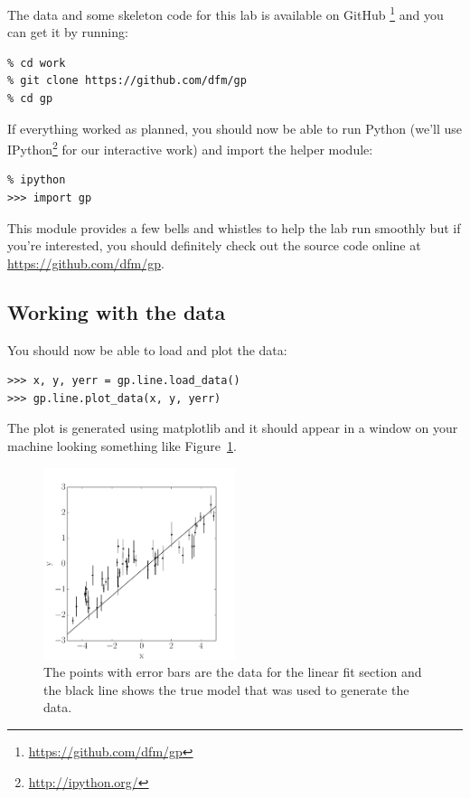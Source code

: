\documentclass[12pt,preprint]{aastex}
\newcommand{\project}[1]{{\sffamily #1}}
\newcommand{\ipython}{\project{IPython}}
\newcommand{\Fig}[1]{Figure~\ref{fig:#1}}
\newcommand{\fig}[1]{\Fig{#1}}
\newcommand{\figlabel}[1]{\label{fig:#1}}
\begin{document}
The data and some skeleton code for this lab is available on GitHub%
\footnote{\url{https://github.com/dfm/gp}} and you can get it by running:
\begin{lstlisting}
% cd work
% git clone https://github.com/dfm/gp
% cd gp
\end{lstlisting}

If everything worked as planned, you should now be able to run Python (we'll
use \ipython\footnote{\url{http://ipython.org/}} for our interactive work) and
import the helper module:
\begin{lstlisting}
% ipython
>>> import gp
\end{lstlisting}
This module provides a few bells and whistles to help the lab run smoothly but
if you're interested, you should definitely check out the source code online
at \url{https://github.com/dfm/gp}.

\subsection{Working with the data}

You should now be able to load and plot the data:
\begin{lstlisting}
>>> x, y, yerr = gp.line.load_data()
>>> gp.line.plot_data(x, y, yerr)
\end{lstlisting}
The plot is generated using \project{matplotlib} and it should appear in a
window on your machine looking something like \fig{line-data}.

\begin{figure}[htbp]
\begin{center}
\includegraphics[width=0.5\textwidth]{figures/line_data.pdf}
\end{center}
\caption{%
The points with error bars are the data for the linear fit section and the
black line shows the true model that was used to generate the data.
\figlabel{line-data}}
\end{figure}
\end{document}
